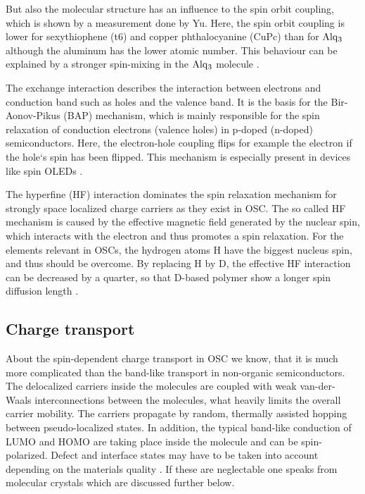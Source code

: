 But also the molecular structure has an influence to the spin orbit coupling, which is shown by a measurement done by Yu.
Here, the spin orbit coupling is lower for sexythiophene (t6) and copper phthalocyanine (CuPc) than for $\ce{Alq_3}$ although the aluminum has the lower atomic number.
This behaviour can be explained by a stronger spin-mixing in the $\ce{Alq_3}$ molecule \cite{perovskite}.

The exchange interaction describes the interaction between electrons and conduction band such as holes and the valence band.
It is the basis for the Bir-Aonov-Pikus (BAP) mechanism, which is mainly responsible for the spin relaxation of conduction electrons (valence holes) in p-doped (n-doped) semiconductors.
Here, the electron-hole coupling flips for example the electron if the hole`s spin has been flipped.
This mechanism is especially present in devices like spin OLEDs \cite{perovskite} \cite{spin-OLED}.

The hyperfine (HF) interaction dominates the spin relaxation mechanism for strongly space localized charge carriers as they exist in OSC.
The so called HF mechanism is caused by the effective magnetic field generated by the nuclear spin, which interacts with the electron and thus promotes a spin relaxation.
For the elements relevant in OSCs, the hydrogen atoms H have the biggest nucleus spin, and thus should be overcome.
By replacing H by D, the effective HF interaction can be decreased by a quarter, so that D-based polymer show a longer spin diffusion length \cite{perovskite} \cite{hyperfine}.

\subsection{Charge transport}

About the spin-dependent charge transport in OSC we know, that it is much more complicated than the band-like transport in non-organic semiconductors.
The delocalized carriers inside the molecules are coupled with weak van-der-Waals interconnections between the molecules, what heavily limits the overall carrier mobility.
The carriers propagate by random, thermally assisted hopping between pseudo-localized states.
In addition, the typical band-like conduction of LUMO and HOMO are taking place inside the molecule and can be spin-polarized.
Defect and interface states may have to be taken into account depending on the materials quality \cite{routes} \cite{perovskite}.
If these are neglectable one speaks from molecular crystals which are discussed further below.


